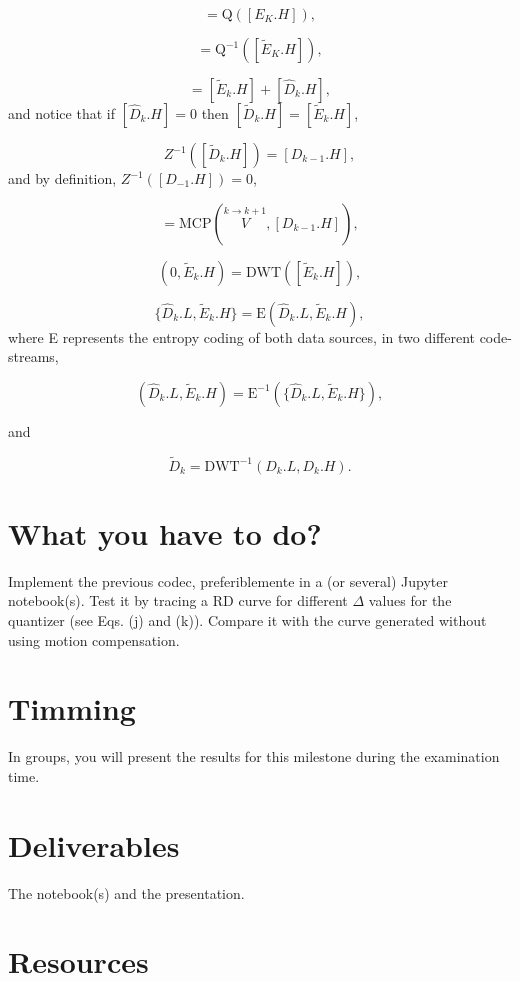 \begin{equation}
  [\tilde{E}_k.H] = \text{Q}([E_K.H]),
  \tag{j}
\end{equation}

\begin{equation}
  [\tilde{E}_k.H] = \text{Q}^{-1}([\tilde{E}_K.H]),
  \tag{k}
\end{equation}

\begin{equation}
  [\tilde{D}_k.H] = [\tilde{E}_k.H] + [\hat{D}_k.H],
  \tag{l}
\end{equation}
and notice that if $[\hat{D}_k.H]=0$ then $[\tilde{D}_k.H] =
[\tilde{E}_k.H]$,

\begin{equation}
  Z^{-1}([\tilde{D}_k.H]) = [D_{k-1}.H],
  \tag{m}
\end{equation}
and by definition, $Z^{-1}([D_{-1}.H]) = 0$,

\begin{equation}
  [\hat{D}_k.H] = \text{MCP}(\overset{k\rightarrow k+1}{V}, [D_{k-1}.H]),
  \tag{n}
\end{equation}

\begin{equation}
  (0, \tilde{E}_k.H) = \text{DWT}([\tilde{E}_k.H]),
  \tag{o}
\end{equation}

\begin{equation}
  \{\hat{D}_k.L, \tilde{E}_k.H\} = \text{E}(\hat{D}_k.L, \tilde{E}_k.H),
  \tag{p}
\end{equation}
where E represents the entropy coding of both data sources, in two
different code-streams,

\begin{equation}
  (\hat{D}_k.L, \tilde{E}_k.H) = \text{E}^{-1}(\{\hat{D}_k.L, \tilde{E}_k.H\}),
  \tag{q}
\end{equation}

and

\begin{equation}
  \tilde{D}_k = \text{DWT}^{-1}(D_k.L, D_k.H).
  \tag{r}
\end{equation}

\section{What you have to do?}

Implement the previous codec, preferiblemente in a (or several)
Jupyter notebook(s). Test it by tracing a RD curve for different
$\Delta$ values for the quantizer (see Eqs. (j) and (k)). Compare it
with the curve generated without using motion compensation.

\section{Timming}

In groups, you will present the results for this milestone during the
examination time.

\section{Deliverables}

The notebook(s) and the presentation.

\section{Resources}


